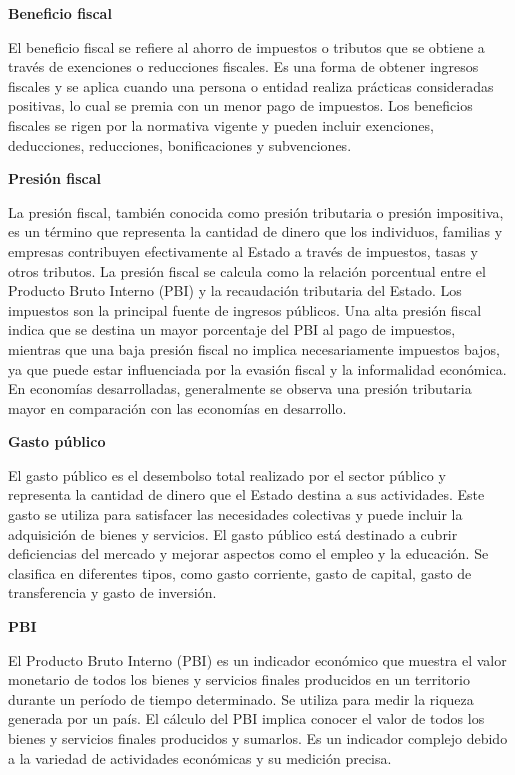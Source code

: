 \documentclass[
  letterpaper,
]{article}
\begin{document}
\textbf{Beneficio fiscal}

El beneficio fiscal se refiere al ahorro de impuestos o tributos que se
obtiene a través de exenciones o reducciones fiscales. Es una forma de
obtener ingresos fiscales y se aplica cuando una persona o entidad
realiza prácticas consideradas positivas, lo cual se premia con un menor
pago de impuestos. Los beneficios fiscales se rigen por la normativa
vigente y pueden incluir exenciones, deducciones, reducciones,
bonificaciones y subvenciones.

\textbf{Presión fiscal}

La presión fiscal, también conocida como presión tributaria o presión
impositiva, es un término que representa la cantidad de dinero que los
individuos, familias y empresas contribuyen efectivamente al Estado a
través de impuestos, tasas y otros tributos. La presión fiscal se
calcula como la relación porcentual entre el Producto Bruto Interno
(PBI) y la recaudación tributaria del Estado. Los impuestos son la
principal fuente de ingresos públicos. Una alta presión fiscal indica
que se destina un mayor porcentaje del PBI al pago de impuestos,
mientras que una baja presión fiscal no implica necesariamente impuestos
bajos, ya que puede estar influenciada por la evasión fiscal y la
informalidad económica. En economías desarrolladas, generalmente se
observa una presión tributaria mayor en comparación con las economías en
desarrollo.

\textbf{Gasto público}

El gasto público es el desembolso total realizado por el sector público
y representa la cantidad de dinero que el Estado destina a sus
actividades. Este gasto se utiliza para satisfacer las necesidades
colectivas y puede incluir la adquisición de bienes y servicios. El
gasto público está destinado a cubrir deficiencias del mercado y mejorar
aspectos como el empleo y la educación. Se clasifica en diferentes
tipos, como gasto corriente, gasto de capital, gasto de transferencia y
gasto de inversión.

\textbf{PBI}

El Producto Bruto Interno (PBI) es un indicador económico que muestra el
valor monetario de todos los bienes y servicios finales producidos en un
territorio durante un período de tiempo determinado. Se utiliza para
medir la riqueza generada por un país. El cálculo del PBI implica
conocer el valor de todos los bienes y servicios finales producidos y
sumarlos. Es un indicador complejo debido a la variedad de actividades
económicas y su medición precisa.
\end{document}
